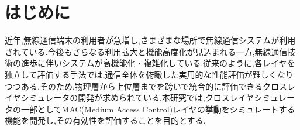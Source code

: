 \documentclass[a4paper, 10pt]{ltjsarticle}
\begin{document}
\setlength{\columnsep}{7.5mm}

\twocolumn[
    \begin{center}
        {\vspace{-1em}}

        {\fontsize{15pt}{15pt}\selectfont{クロスレイヤシミュレータにおける無線LAN評価モデルの検討}}

        {\vspace{1.3em}}

        {\fontsize{13pt}{13pt}\selectfont{A Study of a Wireless LAN Evaluation Model in a Cross-Layer Simulator}}
    \end{center}

    \vspace{0.1em}

    \begin{flushright}
      {\fontsize{11pt}{11pt}\selectfont{T5-16 \, 下沢亮太郎}}
      \\
      {\fontsize{11pt}{11pt}\selectfont{指導教員 \, 設樂勇}}
    \end{flushright}

    \vspace{1em}

    \thispagestyle{empty}
]

\section{はじめに}

近年,無線通信端末の利用者が急増し,さまざまな場所で無線通信システムが利用されている.今後もさらなる利用拡大と機能高度化が見込まれる一方,無線通信技術の進歩に伴いシステムが高機能化・複雑化している.従来のように,各レイヤを独立して評価する手法では,通信全体を俯瞰した実用的な性能評価が難しくなりつつある.そのため,物理層から上位層までを跨いで統合的に評価できるクロスレイヤシミュレータの開発が求められている.本研究では,クロスレイヤシミュレータの一部としてMAC(Medium Access Control)レイヤの挙動をシミュレートする機能を開発し,その有効性を評価することを目的とする.
\end{document}
